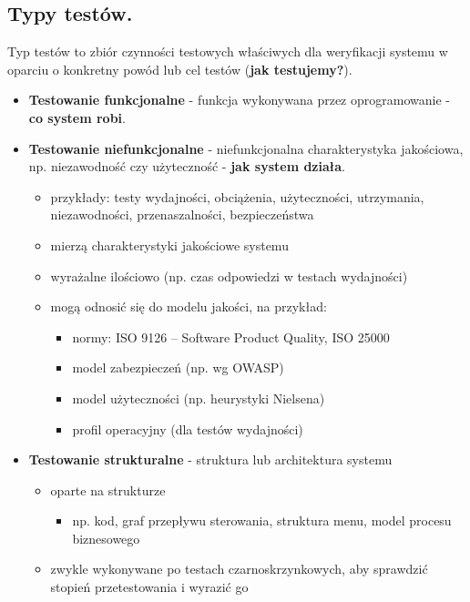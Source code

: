 \documentclass[../main.tex]{subfiles}
\begin{document}
    \subsection{Typy testów.}

    Typ testów to zbiór czynności testowych właściwych dla weryfikacji systemu
    w oparciu o konkretny powód lub cel testów (\textbf{jak testujemy?}).

    \begin{itemize}
        \item \textbf{Testowanie funkcjonalne} - funkcja wykonywana przez oprogramowanie - \textbf{co system robi}.
        \item \textbf{Testowanie niefunkcjonalne} - niefunkcjonalna charakterystyka jakościowa, np. niezawodność
        czy użyteczność - \textbf{jak system działa}.
        \begin{itemize}
            \item przykłady: testy wydajności, obciążenia, użyteczności, utrzymania,
            niezawodności, przenaszalności, bezpieczeństwa
            \item mierzą charakterystyki jakościowe systemu
            \item wyrażalne ilościowo (np. czas odpowiedzi w testach wydajności)
            \item mogą odnosić się do modelu jakości, na przykład:
            \begin{itemize}
                \item normy: ISO 9126 – Software Product Quality, ISO 25000
                \item model zabezpieczeń (np. wg OWASP)
                \item model użyteczności (np. heurystyki Nielsena)
                \item profil operacyjny (dla testów wydajności)
            \end{itemize}
        \end{itemize}
        \item \textbf{Testowanie strukturalne} - struktura lub architektura systemu
        \begin{itemize}
            \item oparte na strukturze
            \begin{itemize}
                \item np. kod, graf przepływu sterowania, struktura menu, model procesu biznesowego
            \end{itemize}
            \item zwykle wykonywane po testach czarnoskrzynkowych, aby sprawdzić stopień przetestowania i wyrazić go

\end{itemize}
\end{itemize}
\end{document}
